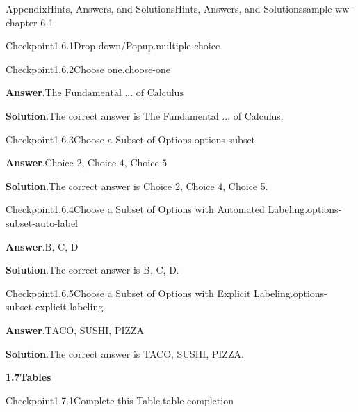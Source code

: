 \documentclass[oneside,10pt,]{book}
\newcommand{\blocktitlefont}{\relax}
\numberwithin{equation}{section}
\begin{document}
\begin{solutions-chapter}{Appendix}{Hints, Answers, and Solutions}{}{Hints, Answers, and Solutions}{}{}{sample-ww-chapter-6-1}
\begin{inlinesolution}{Checkpoint}{1.6.1}{Drop-down\slash{}Popup.}{multiple-choice}
\end{inlinesolution}%
\begin{inlinesolution}{Checkpoint}{1.6.2}{Choose one.}{choose-one}%
\par\smallskip%
\noindent\textbf{\blocktitlefont Answer}.\hypertarget{choose-one-3-back}{}\quad{}\(\text{The Fundamental ... of Calculus}\)%
\par\smallskip%
\noindent\textbf{\blocktitlefont Solution}.\hypertarget{choose-one-4-back}{}\quad{}The correct answer is The Fundamental ... of Calculus.%
\end{inlinesolution}%
\begin{inlinesolution}{Checkpoint}{1.6.3}{Choose a Subset of Options.}{options-subset}%
\par\smallskip%
\noindent\textbf{\blocktitlefont Answer}.\hypertarget{options-subset-3-back}{}\quad{}\(\text{Choice 2, Choice 4, Choice 5}\)%
\par\smallskip%
\noindent\textbf{\blocktitlefont Solution}.\hypertarget{options-subset-4-back}{}\quad{}The correct answer is Choice 2, Choice 4, Choice 5.%
\end{inlinesolution}%
\begin{inlinesolution}{Checkpoint}{1.6.4}{Choose a Subset of Options with Automated Labeling.}{options-subset-auto-label}%
\par\smallskip%
\noindent\textbf{\blocktitlefont Answer}.\hypertarget{options-subset-auto-label-3-back}{}\quad{}\(\text{B, C, D}\)%
\par\smallskip%
\noindent\textbf{\blocktitlefont Solution}.\hypertarget{options-subset-auto-label-4-back}{}\quad{}The correct answer is B, C, D.%
\end{inlinesolution}%
\begin{inlinesolution}{Checkpoint}{1.6.5}{Choose a Subset of Options with Explicit Labeling.}{options-subset-explicit-labeling}%
\par\smallskip%
\noindent\textbf{\blocktitlefont Answer}.\hypertarget{options-subset-explicit-labeling-3-back}{}\quad{}\(\text{TACO, SUSHI, PIZZA}\)%
\par\smallskip%
\noindent\textbf{\blocktitlefont Solution}.\hypertarget{options-subset-explicit-labeling-4-back}{}\quad{}The correct answer is TACO, SUSHI, PIZZA.%
\end{inlinesolution}%
\par\medskip
\noindent\textbf{\Large{}1.7\space\textperiodcentered\space{}Tables}
\begin{inlinesolution}{Checkpoint}{1.7.1}{Complete this Table.}{table-completion}%

\end{inlinesolution}
\end{solutions-chapter}
\end{document}
